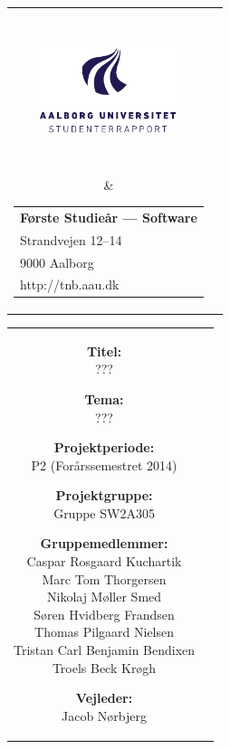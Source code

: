 \thispagestyle{empty}
\enlargethispage*{\ifcounts 4\else 2\fi\baselineskip}
{\samepage
\begin{tabular}{cc}
  \parbox{0.5\textwidth}{ %
    \hspace*{1cm} %
    \includegraphics[width=4cm,height=4cm,keepaspectratio]{images/aau_logo_da.pdf}} &
  \parbox{0.5\textwidth}{\begin{tabular}{l}
      {\small \textbf{Første Studieår --- Software}}\\
      {\small Strandvejen 12--14} \\
      {\small 9000 Aalborg} \\
      {\small http://tnb.aau.dk}
    \end{tabular}}
\end{tabular}

\begin{tabular}{cc}
  \parbox{8cm}{
  \begin{description}
    \item { \textbf{Titel:}}\\ 
      ???
    \item { \textbf{Tema:}}\\ 
      ???
  \end{description}
  
  \parbox{8cm}{
  \begin{description}
    \item { \textbf{Projektperiode:}}\\
      P2 (Forårssemestret 2014)
    \hspace{4cm}
    \item { \textbf{Projektgruppe:}}\\
        Gruppe SW2A305
    \hspace{4cm}
    \item {\textbf{Gruppemedlemmer:}}\\
      Caspar Rosgaard Kuchartik\\
      Marc Tom Thorgersen\\
      Nikolaj Møller Smed\\
      Søren Hvidberg Frandsen\\
      Thomas Pilgaard Nielsen\\
      Tristan Carl Benjamin Bendixen\\
      Troels Beck Krøgh\\
    \hspace{2cm}
    \item { \textbf{Vejleder:}}\\
      Jacob Nørbjerg\\
    \end{description}
  }

}
\end{tabular}}
